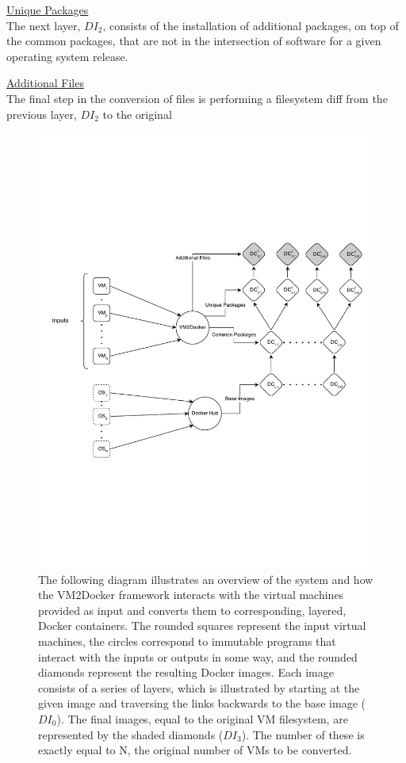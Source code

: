 \underline{Unique Packages}\\
The next layer, $DI_2$, consists of the installation of additional packages, on top of the common packages, that are not in the intersection of software for a given operating system release.

\underline{Additional Files}\\
The final step in the conversion of files is performing a filesystem diff from the previous layer, $DI_2$ to the original 


\newpage
\newpage

\begin{figure}[h]

\centering
    \includegraphics[width=1.0\textwidth]{system.pdf}
    \caption{The following diagram illustrates an overview of the system and how the VM2Docker framework interacts with the virtual machines provided as input and converts them to corresponding, layered, Docker containers. The rounded squares represent the input virtual machines, the circles correspond to immutable programs that interact with the inputs or outputs in some way, and the rounded diamonds represent the resulting Docker images. Each image consists of a series of layers, which is illustrated by starting at the given image and traversing the links backwards to the base image ($DI_0$). The final images, equal to the original VM filesystem, are represented by the shaded diamonds ($DI_3$). The number of these is exactly equal to N, the original number of VMs to be converted.}
\label{fig:systemeval}
\end{figure}

